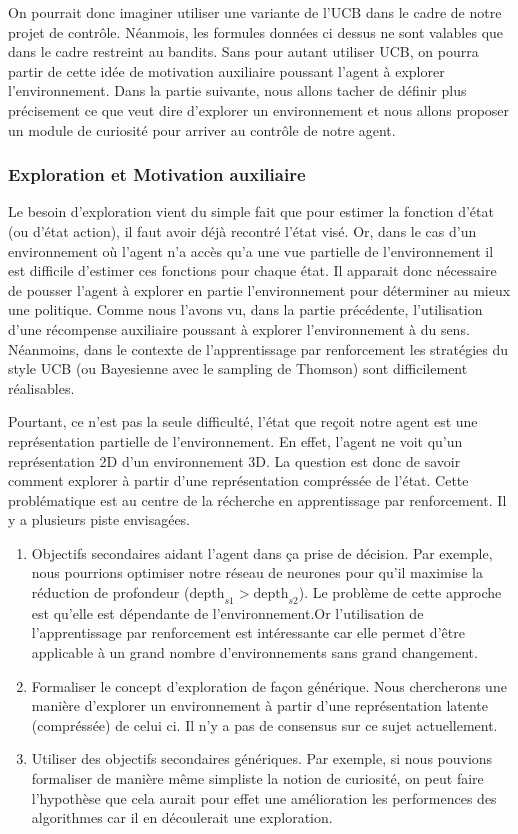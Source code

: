 On pourrait donc imaginer utiliser une variante de l'\gls{UCB} dans le cadre de notre projet de contrôle. Néanmois, les formules données ci dessus ne sont valables que dans le cadre restreint au bandits. 
Sans pour autant utiliser \gls{UCB}, on pourra partir de cette idée de motivation auxiliaire poussant l'agent à explorer l'environnement. Dans la partie suivante, nous allons tacher de définir plus précisement ce que veut dire d'explorer un environnement et nous allons proposer un module de curiosité pour arriver au contrôle de notre agent.

\subsubsection{Exploration et Motivation auxiliaire}

Le besoin d'exploration vient du simple fait que pour estimer la fonction d'état (ou d'état action), il faut avoir déjà recontré l'état visé. Or, dans le cas d'un environnement où l'agent n'a accès qu'a une vue partielle de l'environnement il est difficile d'estimer ces fonctions pour chaque état. Il apparait donc nécessaire de pousser l'agent à explorer en partie l'environnement pour déterminer au mieux une politique. Comme nous l'avons vu, dans la partie précédente, l'utilisation d'une récompense auxiliaire poussant à explorer l'environnement à du sens. Néanmoins, dans le contexte de l'apprentissage par renforcement les stratégies du style UCB (ou Bayesienne avec le sampling de Thomson) sont difficilement réalisables.

Pourtant, ce n'est pas la seule difficulté, l'état que reçoit notre agent est une représentation partielle de l'environnement. En effet, l'agent ne voit qu'un représentation 2D d'un environnement 3D. La question est donc de savoir comment explorer à partir d'une représentation compréssée de l'état. Cette problématique est au centre de la récherche en apprentissage par renforcement. Il y a plusieurs piste envisagées.

\begin{enumerate}
    \item Objectifs secondaires aidant l'agent dans ça prise de décision. Par exemple, nous pourrions optimiser notre réseau de neurones pour qu'il maximise la réduction de profondeur ($\text{depth}_{s1} > \text{depth}_{s2}$). Le problème de cette approche est qu'elle est dépendante de l'environnement.Or l'utilisation de l'apprentissage par renforcement est intéressante car elle permet d'être applicable à un grand nombre d'environnements sans grand changement.
    \item Formaliser le concept d'exploration de façon générique. Nous chercherons une manière d'explorer un environnement à partir d'une représentation latente (compréssée) de celui ci. Il n'y a pas de consensus sur ce sujet actuellement.

    \item Utiliser des objectifs secondaires génériques. Par exemple, si nous pouvions formaliser de manière même simpliste la notion de curiosité, on peut faire l'hypothèse que cela aurait pour effet une amélioration les performences des algorithmes car il en découlerait une exploration.
\end{enumerate}


